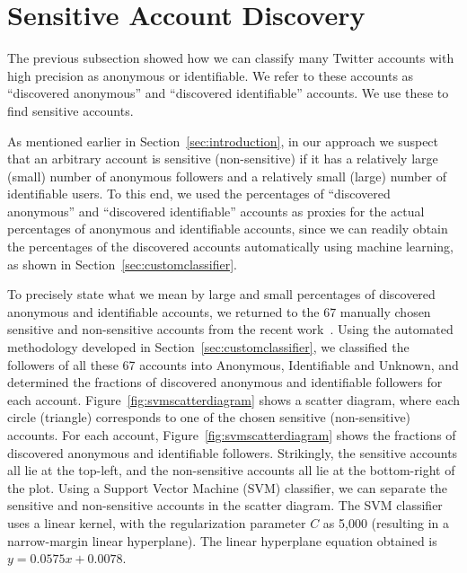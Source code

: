 \documentclass[conference]{IEEEtran}
\begin{document}
\section{Sensitive Account Discovery}
\label{sec:sensitiveaccountdetection}

The previous subsection showed how we can classify many Twitter accounts with high precision as anonymous or identifiable. We refer to these accounts
as ``discovered  anonymous'' and ``discovered identifiable'' accounts. 
We use these to find sensitive accounts.

As mentioned earlier in Section~\ref{sec:introduction}, in our approach we suspect that an arbitrary account is sensitive (non-sensitive) if it has a relatively large (small) number of anonymous followers and a relatively small (large) number of identifiable users. 
To this end, we used the percentages of ``discovered  anonymous'' and ``discovered identifiable'' accounts as proxies for the actual percentages of  anonymous and identifiable accounts, since we can readily obtain the percentages of the discovered accounts automatically using machine learning, as shown in  Section~\ref{sec:customclassifier}. 


To precisely state what we mean by large and small percentages of discovered anonymous and identifiable accounts, we returned to the 67 manually chosen sensitive and non-sensitive accounts  from the recent work~\cite{PeddintiCOSN2014}. 
Using the automated methodology developed in Section~\ref{sec:customclassifier}, we classified the followers of all these 67 accounts into Anonymous, Identifiable and Unknown, and determined the fractions of discovered anonymous and identifiable followers for each account. Figure~\ref{fig:svmscatterdiagram} shows a scatter diagram, where each circle (triangle) corresponds to one of the chosen sensitive (non-sensitive) accounts. For each account, Figure~\ref{fig:svmscatterdiagram} shows the fractions of discovered anonymous and identifiable followers. Strikingly, the sensitive accounts all lie at the top-left, and the non-sensitive accounts all lie at the bottom-right of the plot. Using a Support Vector Machine (SVM) classifier, we can  separate the sensitive and non-sensitive accounts in the scatter diagram. The SVM classifier uses a linear kernel, with the regularization parameter $C$ as 5,000 (resulting in a narrow-margin linear hyperplane).  The linear hyperplane equation obtained is $y=0.0575x+0.0078$. 
\end{document}
